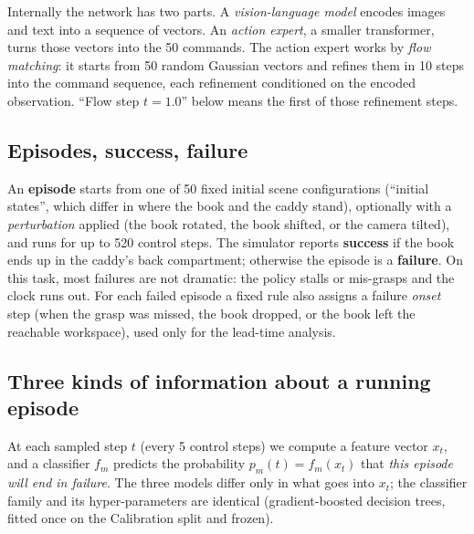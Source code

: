 \documentclass[11pt,a4paper]{article}
\begin{document}
Internally the network has two parts. A \emph{vision-language model} encodes images and text into a sequence of vectors. An \emph{action expert}, a smaller transformer, turns those vectors into the 50 commands. The action expert works by \emph{flow matching}: it starts from 50 random Gaussian vectors and refines them in 10 steps into the command sequence, each refinement conditioned on the encoded observation. ``Flow step $t{=}1.0$'' below means the first of those refinement steps.

\subsection{Episodes, success, failure}
An \textbf{episode} starts from one of 50 fixed initial scene configurations (``initial states'', which differ in where the book and the caddy stand), optionally with a \emph{perturbation} applied (the book rotated, the book shifted, or the camera tilted), and runs for up to 520 control steps. The simulator reports \textbf{success} if the book ends up in the caddy's back compartment; otherwise the episode is a \textbf{failure}. On this task, most failures are not dramatic: the policy stalls or mis-grasps and the clock runs out. For each failed episode a fixed rule also assigns a failure \emph{onset} step (when the grasp was missed, the book dropped, or the book left the reachable workspace), used only for the lead-time analysis.

\subsection{Three kinds of information about a running episode}
At each sampled step $t$ (every 5 control steps) we compute a feature vector $x_t$, and a classifier $f_m$ predicts the probability $p_m(t) = f_m(x_t)$ that \emph{this episode will end in failure}. The three models differ only in what goes into $x_t$; the classifier family and its hyper-parameters are identical (gradient-boosted decision trees, fitted once on the Calibration split and frozen).
\end{document}
